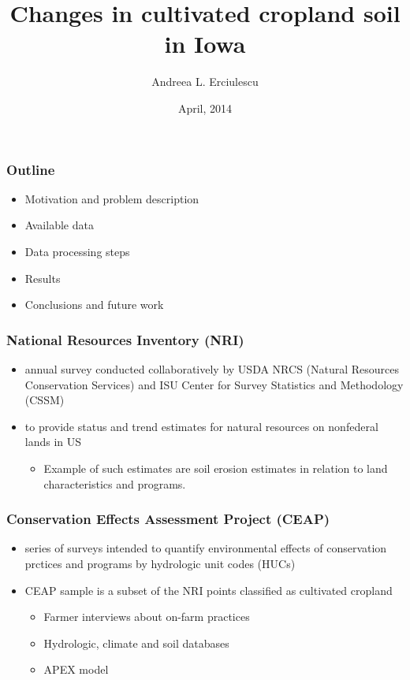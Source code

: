 \documentclass[xcolor=pdftex,dvipsnames,table]{beamer}
\title[STAT585X Class project]{Changes in cultivated cropland soil in Iowa }
\author[Andreea L. Erciulescu]{Andreea L. Erciulescu}
\date{April, 2014}
\institute[ISU]{Iowa State University  \\ Statistics Department}
\begin{document}

\begin{frame}
\titlepage
\end{frame}

\begin{frame}
\frametitle{Outline}
\begin{itemize}
\item Motivation and problem description
\item Available data 
\item Data processing steps
\item Results
\item Conclusions and future work
\end{itemize}
\end{frame}


\begin{frame}
\frametitle{National Resources Inventory (NRI)}

\begin{itemize}
\item annual survey conducted collaboratively by USDA NRCS (Natural
Resources Conservation Services) and ISU Center for Survey Statistics and Methodology (CSSM)
\item to
provide status and trend estimates for natural resources on nonfederal lands in US
  \begin{itemize}
  \item Example of such estimates are soil erosion estimates in relation to land characteristics and programs.
  \end{itemize}
\end{itemize}
\end{frame}

\begin{frame}
\frametitle{Conservation Effects Assessment Project (CEAP)}

\begin{itemize}
\item series of surveys intended to quantify environmental
effects of conservation prctices and programs by hydrologic unit codes (HUCs)
\item CEAP sample is a subset of the NRI points classified as cultivated cropland
    \begin {itemize}
    \item Farmer interviews about on-farm practices  
  	\item Hydrologic, climate and soil databases
		\item APEX model
    \end{itemize}
\end{itemize}
\end{frame}
\end{document}
